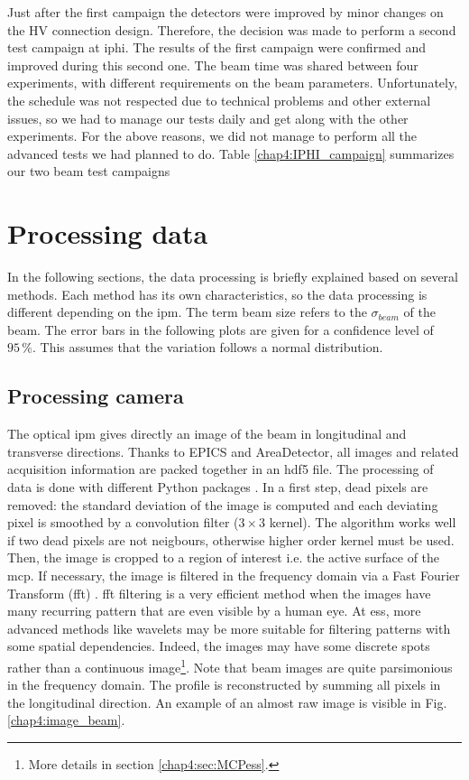 \begin{refsection}
  Just after the first campaign the detectors were improved by minor changes on the HV connection design. Therefore, the decision was made to perform a second test campaign at \acrshort{iphi}.
  The results of the first campaign were confirmed and improved during this second one.
  The beam time was shared between four experiments, with different requirements on the beam parameters.
  Unfortunately, the schedule was not respected due to technical problems and other external issues, so
  we had to manage our tests daily and get along with the other experiments.
 For the above reasons, we did not manage to perform all the advanced tests we had planned to do.
  Table \ref{chap4:IPHI_campaign} summarizes our two beam test campaigns

  


  \section{Processing data}
  In the following sections, the data processing is briefly explained based on several methods. Each method has its own characteristics, so the data processing is different depending on the \acrshort{ipm}. The term beam size refers to the $\sigma_{beam}$ of the beam. The error bars in the following plots are given for a confidence level of $95\,\mathrm{\%}$. This assumes that the variation follows a normal distribution.

  \subsection{Processing camera}

  The optical \acrshort{ipm} gives directly an image of the beam in longitudinal and transverse directions. Thanks to EPICS and AreaDetector, all images and related acquisition information are packed together in an \acrshort{hdf}5 file. The processing of data is done with different Python packages \cite{NumPy2011,SciPy2019,Hunter2007}. In a first step, dead pixels are removed: the standard deviation of the image is computed and each deviating pixel is smoothed by a convolution filter ($3\times3$ kernel). The algorithm works well if two dead pixels are not neigbours, otherwise higher order kernel must be used. Then, the image is cropped to a region of interest i.e. the active surface of the \acrshort{mcp}. If necessary, the image is filtered in the frequency domain via a Fast Fourier Transform (\acrshort{fft}) \cite{Burrus2012}. \acrshort{fft} filtering is a very efficient method when the images have many recurring pattern that are even visible by a human eye. At \acrshort{ess}, more advanced methods like wavelets \cite{Burrus1997,bultheel2014} may be more suitable for filtering patterns with some spatial dependencies. Indeed, the images may have some discrete spots rather than a continuous image\footnote{More details in section \ref{chap4:sec:MCPess}.}. Note that beam images are quite parsimonious in the frequency domain. The profile is reconstructed by summing all pixels in the longitudinal direction. An example of an almost raw image is visible in Fig. \ref{chap4:image_beam}.


\end{refsection}
